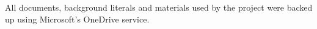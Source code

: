 All documents, background literals and materials used by the project were backed up using Microsoft's OneDrive service.


